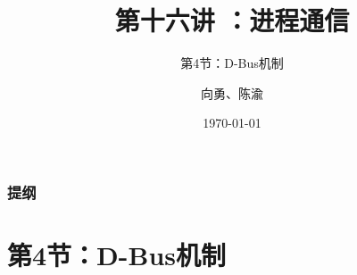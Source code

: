 


\title[第16讲]{第十六讲 ：进程通信} %
\subtitle{第4节：D-Bus机制}
\author{向勇、陈渝} %
\date{\today} %



\begin{frame}
\titlepage %
\end{frame}

\begin{frame}
\frametitle{提纲} %
\tableofcontents %

\end{frame}
\section{第4节：D-Bus机制} %
